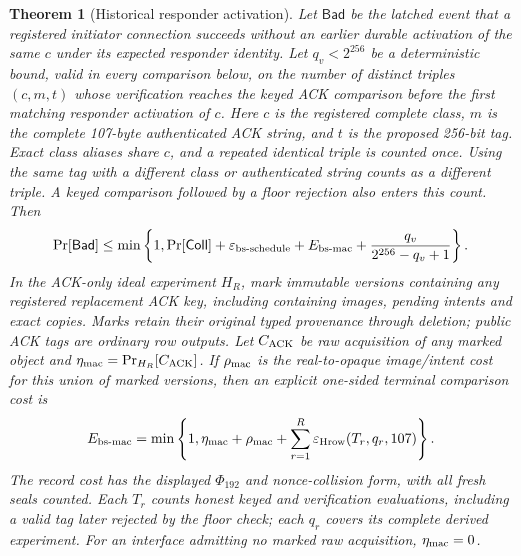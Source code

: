 \documentclass[pdflatex]{sn-jnl}
\theoremstyle{thmstyleone}
\newtheorem{theorem}{Theorem}[section]
\theoremstyle{thmstylethree}
\theoremstyle{thmstyletwo}
\begin{document}
\begin{theorem}[Historical responder activation]
\label{thm:bootstrap-terminal}
Let $\mathsf{Bad}$ be the latched event that a registered initiator
connection succeeds without an earlier durable activation of the same
$c$ under its expected responder identity. Let $q_v<2^{256}$ be a
deterministic bound, valid in every comparison below, on the number of
distinct triples $(c,m,t)$ whose verification reaches the keyed ACK
comparison before the first matching responder activation of $c$.
Here $c$ is the registered complete class, $m$ is the complete 107-byte
authenticated ACK string, and $t$ is the proposed 256-bit tag. Exact
class aliases share $c$, and a repeated identical triple is counted once.
Using the same tag with a different class or authenticated string counts
as a different triple. A keyed comparison followed by a floor rejection
also enters this count. Then
\begin{equation}
 \Pr[\mathsf{Bad}]\le\min\left\{1,
  \Pr[\mathsf{Coll}]+\varepsilon_{\rm bs\text{-}schedule}
  +E_{\rm bs\text{-}mac}
  +\frac{q_v}{2^{256}-q_v+1}\right\}.
 \label{eq:bootstrap-terminal}
\end{equation}
In the ACK-only ideal experiment $H_R$, mark immutable versions containing
any registered replacement ACK key, including containing images, pending
intents and exact copies. Marks retain their original typed provenance
through deletion; public ACK tags are ordinary row outputs. Let
$C_{\rm ACK}$ be raw acquisition of any marked object and
$\eta_{\rm mac}=\Pr_{H_R}[C_{\rm ACK}]$. If $\rho_{\rm mac}$ is the
real-to-opaque image/intent cost for this union of marked versions, then
an explicit one-sided terminal comparison cost is
\begin{equation}
 E_{\rm bs\text{-}mac}=\min\left\{1,
   \eta_{\rm mac}+\rho_{\rm mac}
   +\sum_{r=1}^{R}\varepsilon_{\rm Hrow}(T_r,q_r,107)\right\}.
 \label{eq:bootstrap-mac-records}
\end{equation}
The record cost has the displayed $\Phi_{192}$ and nonce-collision
form, with all fresh seals counted. Each $T_r$ counts honest keyed
and verification evaluations, including a valid tag later rejected by
the floor check; each $q_r$ covers its complete derived experiment.
For an interface admitting no marked raw acquisition,
$\eta_{\rm mac}=0$.
\end{theorem}
\end{document}
